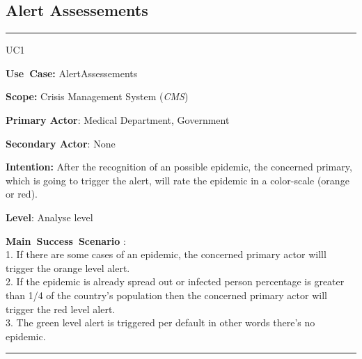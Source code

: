 \subsection{Alert Assessements}
\vspace{0.5cm}
\hrule
\vspace{0.5cm}
\begin{lyxlist}{UC1}
\small{
\item [\textbf{Use~Case:}] AlertAssessements
\item [\textbf{Scope:}] Crisis Management System (\emph{CMS})
\item [\textbf{Primary Actor}:] Medical Department, Government
\item [\textbf{Secondary Actor}:] None
\item [\textbf{Intention:}] After the recognition of an possible epidemic, the
concerned primary, which is going to trigger the alert, will rate the epidemic
in a color-scale (orange or red).
\item [\textbf{Level}:]Analyse level
\item [\textbf{Main~Success~Scenario}]:\\
1. If there are some cases of an epidemic, the concerned primary actor willl
trigger the orange level alert.\\
2. If the epidemic is already spread out or infected person percentage is
greater than 1/4 of the country's population then the concerned primary actor
will trigger the red level alert.\\
3. The green level alert is triggered per default in other words there's no
epidemic.\\ }
\end{lyxlist}
\hrule
\vspace{0.5cm} 


